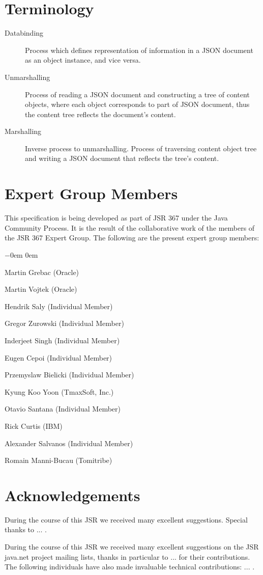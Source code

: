 \section{Terminology}
\label{terminology}

\begin{description}
\item[Databinding] Process which defines representation of information in a JSON document as an object instance, and vice versa.
\item[Unmarshalling] Process of reading a JSON document and constructing a tree of content objects, 
where each object corresponds to part of JSON document, thus the content tree reflects the document's content.
\item[Marshalling] Inverse process to unmarshalling. Process of traversing content object tree and writing a JSON document that reflects the tree's content.

\end{description}

\section{Expert Group Members} 
\label{expert_group}

This specification is being developed as part of JSR 367 under the Java Community Process. 
It is the result of the collaborative work of the members of the JSR 367 Expert Group. 
The following are the present expert group members:

\begin{list}{$-$}{\parsep 0em  0em}
\item Martin Grebac (Oracle)
\item Martin Vojtek (Oracle)
\item Hendrik Saly (Individual Member)
\item Gregor Zurowski (Individual Member) 
\item Inderjeet Singh (Individual Member)
\item Eugen Cepoi (Individual Member)
\item Przemyslaw Bielicki (Individual Member)
\item Kyung Koo Yoon (TmaxSoft, Inc.)
\item Otavio Santana (Individual Member)
\item Rick Curtis (IBM)
\item Alexander Salvanos (Individual Member)
\item Romain Manni-Bucau (Tomitribe)
\end{list}

\section{Acknowledgements}
\label{acks}

During the course of this JSR we received many excellent suggestions. Special thanks to ... .

During the course of this JSR we received many excellent suggestions on the JSR java.net project mailing lists, thanks in particular to ...  for their contributions. The following individuals have also made invaluable technical contributions: ... .
